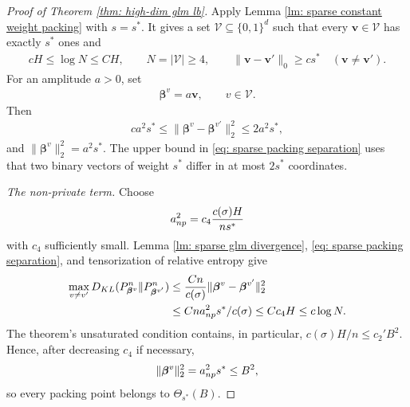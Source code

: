 \documentclass[letterpaper,12pt]{article}
\numberwithin{equation}{section}
\theoremstyle{plain}
\numberwithin{Theorem}{section}
\numberwithin{proposition}{section}
\numberwithin{Lemma}{section}
{
	\theoremstyle{definition}
	\newtheorem{Definition}{Definition}
	\newtheorem{example}{Example}
	\numberwithin{example}{section}
	\newtheorem{fact}{Fact}
	\numberwithin{fact}{section}
	\newtheorem{remark}{Remark}
}
\newcommand{\1}{\mathbbm{1}}
\def\bbeta{{\boldsymbol{\beta}}}
\begin{document}
\begin{proof}[Proof of Theorem \ref{thm: high-dim glm lb}]
Apply Lemma \ref{lm: sparse constant weight packing} with $s=s^*$.
It gives a set $\mathcal V\subseteq\{0,1\}^d$ such that every
$\bm v\in\mathcal V$ has exactly $s^*$ ones and
\begin{align}
    cH\leq\log N\leq CH,\qquad N=|\mathcal V|\geq4,\qquad
    \|\bm v-\bm v'\|_0\geq cs^*
    \quad(\bm v\neq\bm v').                                 \label{eq: sparse constant weight packing}
\end{align}
For an amplitude $a>0$, set
\begin{align*}
    \bbeta^v=a\bm v,\qquad v\in\mathcal V.
\end{align*}
Then
\begin{align}
    ca^2s^*\leq\|\bbeta^v-\bbeta^{v'}\|_2^2
    \leq 2a^2s^*,                                          \label{eq: sparse packing separation}
\end{align}
and $\|\bbeta^v\|_2^2=a^2s^*$.  The upper bound in
\eqref{eq: sparse packing separation} uses that two binary vectors of
weight $s^*$ differ in at most $2s^*$ coordinates.

\textit{The non-private term.}
Choose
\begin{align*}
    a_{\rm np}^2=c_4\frac{c(\sigma)H}{ns^*}
\end{align*}
with $c_4$ sufficiently small.  Lemma \ref{lm: sparse glm divergence},
\eqref{eq: sparse packing separation}, and tensorization of relative
entropy give
\begin{align*}
    \max_{v\neq v'}
    D_{\rm KL}(P_{\bbeta^v}^n\|P_{\bbeta^{v'}}^n)
    &\leq \frac{Cn}{c(\sigma)}
       \|\bbeta^v-\bbeta^{v'}\|_2^2\\
    &\leq Cn a_{\rm np}^2s^*/c(\sigma)
     \leq Cc_4H
     \leq c\log N.
\end{align*}
The theorem's unsaturated condition contains, in particular,
$c(\sigma)H/n\leq c_2'B^2$.  Hence, after decreasing $c_4$ if
necessary,
\begin{align*}
	    \|\bbeta^v\|_2^2=a_{\rm np}^2s^*\leq B^2,
\end{align*}
so every packing point belongs to $\Theta_{s^*}(B)$.


\end{proof}
\end{document}
